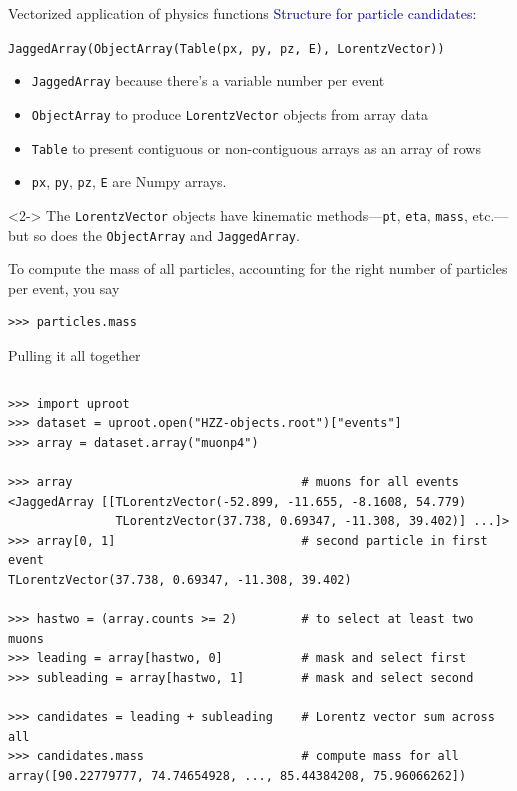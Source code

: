 \documentclass[aspectratio=169]{beamer}
\begin{document}
\begin{frame}[fragile]{Vectorized application of physics functions}
\vspace{0.5 cm}
\textcolor{darkblue}{Structure for particle candidates:}

{\tt \small JaggedArray(ObjectArray(Table(px, py, pz, E), LorentzVector))}

\begin{itemize}
\item {\tt \small JaggedArray} because there's a variable number per event
\item {\tt \small ObjectArray} to produce {\tt \small LorentzVector} objects from array data
\item {\tt \small Table} to present contiguous or non-contiguous arrays as an array of rows
\item {\tt \small px}, {\tt \small py}, {\tt \small pz}, {\tt \small E} are Numpy arrays.
\end{itemize}

\begin{uncoverenv}<2->
\vspace{0.5 cm}
The {\tt \small LorentzVector} objects have kinematic methods---{\tt \small pt}, {\tt \small eta}, {\tt \small mass}, etc.--- but so does the {\tt \small ObjectArray} and {\tt \small JaggedArray}.

\vspace{0.25 cm}
To compute the mass of all particles, accounting for the right number of particles per event, you say

\small\begin{verbatim}
>>> particles.mass
\end{verbatim}
\end{uncoverenv}
\end{frame}

\begin{frame}[fragile]{Pulling it all together}
\small
\vspace{0.1 cm}
\begin{columns}
\begin{verbatim}
>>> import uproot
>>> dataset = uproot.open("HZZ-objects.root")["events"]
>>> array = dataset.array("muonp4")

>>> array                                # muons for all events
<JaggedArray [[TLorentzVector(-52.899, -11.655, -8.1608, 54.779)
               TLorentzVector(37.738, 0.69347, -11.308, 39.402)] ...]>
>>> array[0, 1]                          # second particle in first event
TLorentzVector(37.738, 0.69347, -11.308, 39.402)

>>> hastwo = (array.counts >= 2)         # to select at least two muons
>>> leading = array[hastwo, 0]           # mask and select first
>>> subleading = array[hastwo, 1]        # mask and select second

>>> candidates = leading + subleading    # Lorentz vector sum across all
>>> candidates.mass                      # compute mass for all
array([90.22779777, 74.74654928, ..., 85.44384208, 75.96066262])
\end{verbatim}
\end{columns}
\end{frame}
\end{document}
